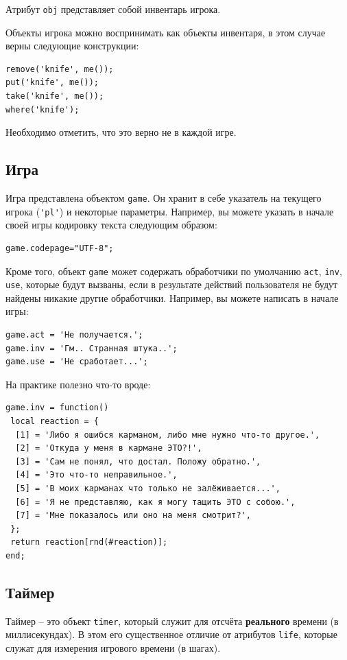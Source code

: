 \documentclass[12pt]{article}
\begin{document}
Атрибут \verb/obj/ представляет собой инвентарь игрока.

Объекты игрока можно воспринимать как объекты инвентаря, в этом случае верны следующие конструкции:

\begin{verbatim}
remove('knife', me());
put('knife', me());
take('knife', me());
where('knife');
\end{verbatim}

Необходимо отметить, что это верно не в каждой игре.

\subsection{Игра}

Игра представлена объектом \verb/game/. Он хранит в себе указатель на текущего игрока (\verb/'pl'/) и некоторые параметры. Например, вы можете указать в начале своей игры кодировку текста следующим образом:

\begin{verbatim}
game.codepage="UTF-8";
\end{verbatim}

Кроме того, объект \verb/game/ может содержать обработчики по умолчанию \verb/act/, \verb/inv/, \verb/use/, которые будут вызваны, если в результате действий пользователя не будут найдены никакие другие обработчики. Например, вы можете написать в начале игры:

\begin{verbatim}
game.act = 'Не получается.';
game.inv = 'Гм.. Странная штука..';
game.use = 'Не сработает...';
\end{verbatim}

На практике полезно что-то вроде:

\begin{verbatim}
game.inv = function()
 local reaction = {
  [1] = 'Либо я ошибся карманом, либо мне нужно что-то другое.',
  [2] = 'Откуда у меня в кармане ЭТО?!',
  [3] = 'Сам не понял, что достал. Положу обратно.',
  [4] = 'Это что-то неправильное.',
  [5] = 'В моих карманах что только не залёживается...',
  [6] = 'Я не представляю, как я могу тащить ЭТО с собою.',
  [7] = 'Мне показалось или оно на меня смотрит?',
 };
 return reaction[rnd(#reaction)];
end;
\end{verbatim}

\subsection{Таймер}
\label{objects_timer}
Таймер -- это объект \verb/timer/, который служит для отсчёта \textbf{реального} времени (в миллисекундах). В этом его существенное отличие от атрибутов \verb/life/, которые служат для измерения игрового времени (в шагах).
\end{document}
